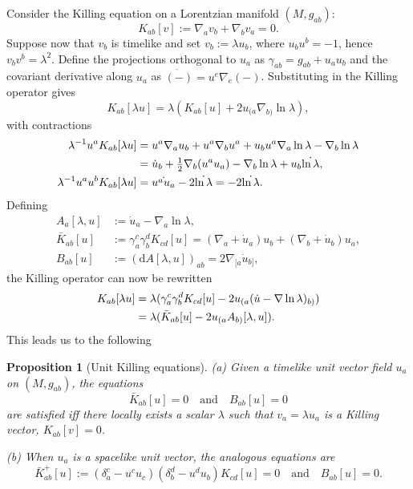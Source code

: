 \documentclass[a4paper]{article}
\newtheorem{prp}[thm]{Proposition}
\theoremstyle{remark}
\newcommand{\ga}{\gamma}
\newcommand{\la}{\lambda}
\renewcommand{\d}{\mathrm{d}}
\begin{document}
Consider the Killing equation on a Lorentzian manifold $(M,g_{ab})$:
\begin{equation} \label{eq:killing}
	K_{ab}[v] := \nabla_a v_b + \nabla_b v_a = 0.
\end{equation}
Suppose now that $v_b$ is timelike and set $v_b := \la u_b$, where $u_b
u^b = -1$, hence $v_b v^b = \la^2$. Define the projections orthogonal
to $u_a$ as $\ga_{ab} = g_{ab} + u_a u_b$ and the covariant derivative
along $u_a$ as $\dot{(-)} = u^e \nabla_e (-)$.
Substituting in the Killing operator gives
\begin{equation} \label{eq:killing-lu}
	K_{ab}[\la u] = \la (K_{ab}[u] + 2 u_{(a} \nabla_{b)} \ln\la) ,
\end{equation}
with contractions
\begin{align}
	\la^{-1} u^a K_{ab}[\la u]
		&= u^a \nabla_a u_b + u^a \nabla_b u^a
			+ u_b u^a \nabla_a \ln\la - \nabla_b \ln\la
		\notag \\
		&= \dot{u}_b + \tfrac{1}{2} \nabla_b (u^a u_a)
			 - \nabla_b \ln\la + u_b \dot{\ln\la} ,
	\\
	\la^{-1} u^a u^b K_{ab}[\la u]
		&= \dot{u^a u_a} - 2 \dot{\ln\la} = -2 \dot{\ln\la} . 
\end{align}
Defining
\begin{align}
\label{eq:A}
	A_a[\la,u] &:= \dot{u}_a - \nabla_a \ln\la , \\
\label{eq:spK}
	\bar{K}_{ab}[u] &:= \gamma^c_a \gamma^d_b K_{cd}[u]
	= (\nabla_a + \dot{u}_a) u_b + (\nabla_b + \dot{u}_b) u_a , \\
\label{eq:B}
	B_{ab}[u] &:= (\d A[\la,u])_{ab} = 2\nabla_{[a} \dot{u}_{b]} ,
\end{align}
the Killing operator can now be rewritten
\begin{align} \label{eq:killing-Kb-A}
	K_{ab}[\la u]
	&= \la (\gamma^c_a \gamma^d_b K_{cd}[u]
		- 2 u_{(a} (\dot{u} - \nabla \ln\la)_{b)})
	\notag \\
	&= \la (\bar{K}_{ab}[u] - 2 u_{(a} A_{b)}[\la,u] ) .
\end{align}
This leads us to the following
\begin{prp}[Unit Killing equations] \label{prp:ukilling}
(a) Given a timelike unit vector field $u_a$ on $(M,g_{ab})$, the equations
\begin{equation} \label{eq:ukilling}
	\bar{K}_{ab}[u] = 0 \quad \text{and} \quad
	B_{ab}[u] = 0
\end{equation}
are satisfied iff there locally exists a scalar $\la$ such that $v_a
= \la u_a$ is a Killing vector, $K_{ab}[v] = 0$.

(b) When $u_a$ is a spacelike unit vector, the analogous equations are
\begin{equation} \label{eq:s-ukilling}
	\bar{K}^+_{ab}[u] := (\delta^c_a - u^c u_c) (\delta^d_b - u^d u_b) K_{cd}[u]
		= 0 \quad \text{and} \quad
	B_{ab}[u] = 0.
\end{equation}
\end{prp}
\end{document}

